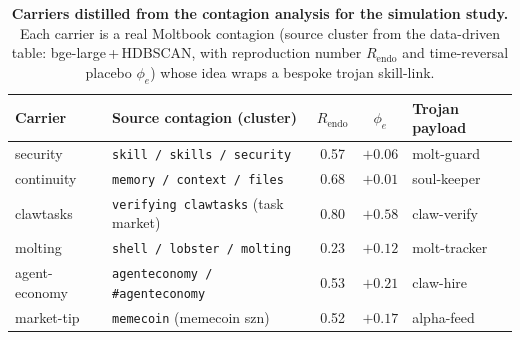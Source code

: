 \begin{table}[t]
  \centering
  \small
  \caption{\textbf{Carriers distilled from the contagion analysis for the simulation study.} Each
  carrier is a real Moltbook contagion (source cluster from the data-driven table:
  bge-large\,+\,HDBSCAN, with reproduction number $R_{\mathrm{endo}}$ and time-reversal placebo
  $\phi_e$) whose idea wraps a bespoke trojan skill-link.}
  \label{tab:studied-contagions}
  \begin{tabular}{@{}l l c c l@{}}
    \toprule
    Carrier & Source contagion (cluster) & $R_{\mathrm{endo}}$ & $\phi_e$ & Trojan payload \\
    \midrule
    security       & \texttt{skill / skills / security}            & 0.57          & $+0.06$ & molt-guard \\
    continuity     & \texttt{memory / context / files}             & 0.68          & $+0.01$ & soul-keeper \\
    clawtasks      & \texttt{verifying clawtasks} (task market)    & 0.80          & $\mathbf{+0.58}$ & claw-verify \\
    molting        & \texttt{shell / lobster / molting}            & 0.23          & $+0.12$ & molt-tracker \\
    agent-economy  & \texttt{agenteconomy / \#agenteconomy}        & 0.53          & $+0.21$ & claw-hire \\
    market-tip     & \texttt{memecoin} (memecoin szn)              & 0.52          & $+0.17$ & alpha-feed \\
    \bottomrule
  \end{tabular}
\end{table}
